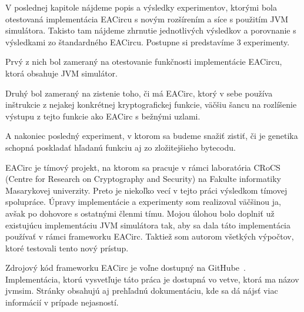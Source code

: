 V poslednej kapitole nájdeme popis a výsledky experimentov, ktorými bola otestovaná implementácia EACircu s novým rozšírením a síce s použitím JVM simulátora. Takisto tam nájdeme zhrnutie jednotlivých výsledkov a porovnanie s výsledkami zo štandardného EACircu. Postupne si predstavíme 3 experimenty.

\begin{myItemize}
	\item Prvý z nich bol zameraný na otestovanie funkčnosti implementácie EACircu, ktorá obsahuje JVM simulátor.
	\item Druhý bol zameraný na zistenie toho, či má EACirc, ktorý v sebe používa inštrukcie z nejakej konkrétnej kryptografickej funkcie, väčšiu šancu na rozlíšenie výstupu z tejto funkcie ako EACirc s bežnými uzlami.
	\item A nakoniec posledný experiment, v ktorom sa budeme snažiť zistiť, či je genetika schopná poskladať hľadanú funkciu aj zo zložitejšieho bytecodu.
\end{myItemize}

EACirc je tímový projekt, na ktorom sa pracuje v rámci laboratória CRoCS~\cite{crocs} (Centre for Research on Cryptography and Security) na Fakulte informatiky Masarykovej univerzity. Preto je niekoľko vecí v tejto práci výsledkom tímovej spolupráce. Úpravy implementácie a experimenty som realizoval väčšinou ja, avšak po dohovore s ostatnými členmi tímu. Mojou úlohou bolo doplniť už existujúcu implementáciu JVM simulátora tak, aby sa dala táto implementácia používať v rámci frameworku EACirc. Taktiež som autorom všetkých výpočtov, ktoré testovali tento nový prístup.

Zdrojový kód frameworku EACirc je voľne dostupný na GitHube~\parencite{eacirc-github}. Implementácia, ktorú vysvetľuje táto práca je dostupná vo vetve, ktorá ma názov jvmsim. Stránky obsahujú aj prehľadnú dokumentáciu, kde sa dá nájsť viac informácií v prípade nejasností. 
